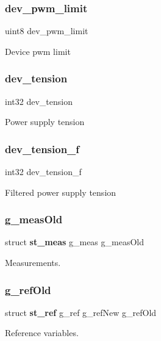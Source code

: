 \subsubsection{dev\+\_\+pwm\+\_\+limit}
{\footnotesize\ttfamily uint8 dev\+\_\+pwm\+\_\+limit}

Device pwm limit \mbox{\label{globals_8c_a53a494e9edc739a4f7c884778d1a93b1}} 
\subsubsection{dev\+\_\+tension}
{\footnotesize\ttfamily int32 dev\+\_\+tension}

Power supply tension \mbox{\label{globals_8c_a600f1f02d397d3ffd8b03b8a4edace02}} 
\subsubsection{dev\+\_\+tension\+\_\+f}
{\footnotesize\ttfamily int32 dev\+\_\+tension\+\_\+f}

Filtered power supply tension \mbox{\label{globals_8c_a47c3980e6bddec492ca4315e36602ba0}} 
\subsubsection{g\+\_\+meas\+Old}
{\footnotesize\ttfamily struct \textbf{ st\+\_\+meas} g\+\_\+meas g\+\_\+meas\+Old}

Measurements. \mbox{\label{globals_8c_a158d26b6d15050b37d8039881d75e0dc}} 
\subsubsection{g\+\_\+ref\+Old}
{\footnotesize\ttfamily struct \textbf{ st\+\_\+ref} g\+\_\+ref g\+\_\+ref\+New g\+\_\+ref\+Old}

Reference variables. \mbox{\label{globals_8c_aa963ce8fafc11e104eb7ee22982d0345}} 
